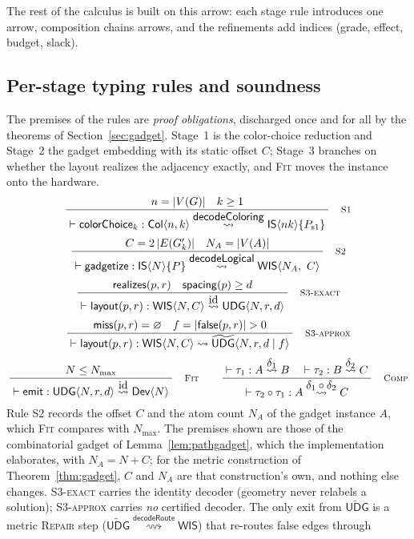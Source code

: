 \documentclass[a4paper,fleqn]{cas-sc}
\newcommand{\tCol}{\mathsf{Col}}
\newcommand{\tIS}{\mathsf{IS}}
\newcommand{\tWIS}{\mathsf{WIS}}
\newcommand{\tUDG}{\mathsf{UDG}}
\newcommand{\tUDGa}{\widetilde{\mathsf{UDG}}}
\newcommand{\tDev}{\mathsf{Dev}}
\newcommand{\Nmax}{N_{\max}}
\newcommand{\realizes}{\mathsf{realizes}}
\newcommand{\false}{\mathsf{false}}
\newcommand{\miss}{\mathsf{miss}}
\newcommand{\rn}[1]{\textup{\textsc{\footnotesize #1}}}
\newcommand{\irule}[2]{\ensuremath{\dfrac{\;#1\;}{\;#2\;}}}
\newcommand{\redto}[1]{\mathrel{\overset{\textstyle #1}{\rightsquigarrow}}}
\begin{document}
The rest of the calculus is built on this arrow: each stage rule introduces one
arrow, composition chains arrows, and the refinements add indices (grade, effect,
budget, slack).

\subsection{Per-stage typing rules and soundness}
\label{sec:typing}

The premises of the rules are \emph{proof obligations}, discharged once and for all
by the theorems of Section~\ref{sec:gadget}. Stage~1 is the color-choice reduction and
Stage~2 the gadget embedding with its static offset $C$; Stage~3 branches on whether
the layout realizes the adjacency exactly, and \rn{Fit} moves the instance onto the
hardware.
\[
  \irule{n=|V(G)| \quad k\ge 1}
        {\vdash \mathsf{colorChoice}_k : \tCol\langle n,k\rangle
          \redto{\mathsf{decodeColoring}} \tIS\langle nk\rangle\{P_{\mathrm{s1}}\}}
  \quad\rn{S1}
\]
\[
  \irule{C = 2\,|E(G'_k)| \quad N_A=|V(A)|}
        {\vdash \mathsf{gadgetize} : \tIS\langle N\rangle\{P\}
          \redto{\mathsf{decodeLogical}} \tWIS\langle N_A,\ C\rangle}
  \quad\rn{S2}
\]
\[
  \irule{\realizes(p,r) \quad \mathsf{spacing}(p)\ge d}
        {\vdash \mathsf{layout}(p,r): \tWIS\langle N,C\rangle
          \redto{\mathrm{id}} \tUDG\langle N,r,d\rangle}
  \quad\rn{S3-exact}
\]
\[
  \irule{\miss(p,r)=\varnothing \quad f=|\false(p,r)|>0}
        {\vdash \mathsf{layout}(p,r): \tWIS\langle N,C\rangle
          \rightsquigarrow \tUDGa\langle N,r,d \mid f\rangle}
  \quad\rn{S3-approx}
\]
\[
  \irule{N\le \Nmax}
        {\vdash \mathsf{emit} : \tUDG\langle N,r,d\rangle \redto{\mathrm{id}} \tDev\langle N\rangle}
  \quad\rn{Fit}
\qquad
  \irule{\vdash \tau_1 : A \redto{\delta_1} B \quad \vdash \tau_2 : B \redto{\delta_2} C}
        {\vdash \tau_2\circ\tau_1 : A \redto{\delta_1\circ\delta_2} C}
  \quad\rn{Comp}
\]
Rule \rn{S2} records the offset $C$ and the atom count $N_A$ of the gadget instance
$A$, which \rn{Fit} compares with $\Nmax$. The premises shown are those of the
combinatorial gadget of Lemma~\ref{lem:pathgadget}, which the implementation
elaborates, with $N_A=N+C$; for the metric construction of Theorem~\ref{thm:gadget},
$C$ and $N_A$ are that construction's own, and nothing else changes. \rn{S3-exact} carries the identity decoder
(geometry never relabels a solution); \rn{S3-approx} carries \emph{no} certified
decoder. The only exit from $\tUDGa$ is a metric \rn{Repair} step
($\tUDGa \redto{\mathsf{decodeRoute}} \tWIS$) that re-routes false edges through
\end{document}
